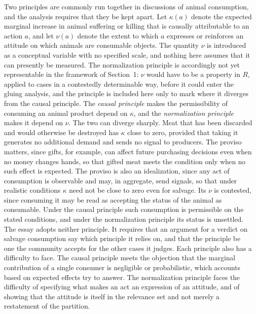 \documentclass[11pt]{article}
\theoremstyle{definition}
\theoremstyle{plain}
\theoremstyle{definition}
\newcommand{\Rel}{R}
\begin{document}
Two principles are commonly run together in discussions of animal consumption, and the analysis requires that they be kept apart. Let $\kappa(a)$ denote the expected marginal increase in animal suffering or killing that is causally attributable to an action $a$, and let $\nu(a)$ denote the extent to which $a$ expresses or reinforces an attitude on which animals are consumable objects. The quantity $\nu$ is introduced as a conceptual variable with no specified scale, and nothing here assumes that it can presently be measured. The normalization principle is accordingly not yet representable in the framework of Section~1: $\nu$ would have to be a property in $\Rel$, applied to cases in a contestedly determinable way, before it could enter the gluing analysis, and the principle is included here only to mark where it diverges from the causal principle. The \emph{causal principle} makes the permissibility of consuming an animal product depend on $\kappa$, and the \emph{normalization principle} makes it depend on $\nu$. The two can diverge sharply. Meat that has been discarded and would otherwise be destroyed has $\kappa$ close to zero, provided that taking it generates no additional demand and sends no signal to producers. The proviso matters, since gifts, for example, can affect future purchasing decisions even when no money changes hands, so that gifted meat meets the condition only when no such effect is expected. The proviso is also an idealization, since any act of consumption is observable and may, in aggregate, send signals, so that under realistic conditions $\kappa$ need not be close to zero even for salvage. Its $\nu$ is contested, since consuming it may be read as accepting the status of the animal as consumable. Under the causal principle such consumption is permissible on the stated conditions, and under the normalization principle its status is unsettled. The essay adopts neither principle. It requires that an argument for a verdict on salvage consumption say which principle it relies on, and that the principle be one the community accepts for the other cases it judges. Each principle also has a difficulty to face. The causal principle meets the objection that the marginal contribution of a single consumer is negligible or probabilistic, which accounts based on expected effects try to answer. The normalization principle faces the difficulty of specifying what makes an act an expression of an attitude, and of showing that the attitude is itself in the relevance set and not merely a restatement of the partition.
\end{document}
